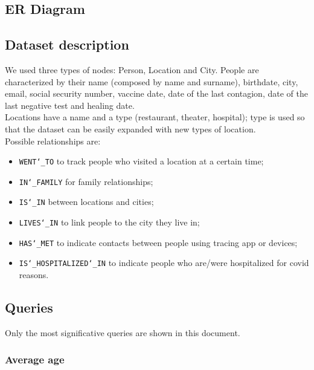\documentclass[12pt, a4paper]{article}
\begin{document}
\subsection{ER Diagram}

\blindtext

\subsection{Dataset description}

We used three types of nodes: Person, Location and City. 
People are characterized by their name (composed by name and surname), 
birthdate, city, email, social security number, vaccine date, date of the last 
contagion, date of the last negative test and healing date. \\
Locations have a name and a type (restaurant, theater, hospital); 
type is used so that the dataset can be easily expanded with new types of 
location. \\
Possible relationships are: 
\begin{itemize}
    \item \texttt{WENT\char`_TO} to track people who visited a location at a 
        certain time;
	\item \texttt{IN\char`_FAMILY} for family relationships;
	\item \texttt{IS\char`_IN} between locations and cities;
	\item \texttt{LIVES\char`_IN} to link people to the city they live in;
    \item \texttt{HAS\char`_MET} to indicate contacts between people using 
        tracing app or devices;
    \item \texttt{IS\char`_HOSPITALIZED\char`_IN} to indicate people who 
        are/were hospitalized for covid reasons.
\end{itemize}

\subsection{Queries}

Only the most significative queries are shown in this document.

\subsubsection{Average age}
\end{document}
